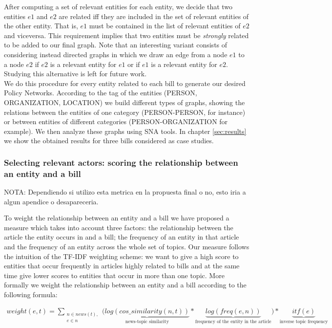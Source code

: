 After computing a set of relevant entities for each entity, we decide that two entities $e1$ and $e2$ are related iff they are included in the set of relevant entities of the other entity. That is, $e1$ must be contained in the list of relevant entities of $e2$ and viceversa. This requirement implies that two entities must be \emph{strongly} related to be added to our final graph. Note that an interesting variant consists of considering instead directed graphs in which we draw an edge from a node $e1$ to a node $e2$ if $e2$ is a relevant entity for $e1$ or if $e1$ is a relevant entity for $e2$. Studying this alternative is left for future work. \\

We do this procedure for every entity related to each bill to generate our desired Policy Networks. According to the tag of the entities (PERSON, ORGANIZATION, LOCATION) we build different types of graphs, showing the relations between the entities of one category (PERSON-PERSON, for instance) or between entities of different categories (PERSON-ORGANIZATION for example). We then analyze these graphs using SNA tools. In chapter \ref{sec:results} we show the obtained results for three bills considered as case studies.


\iffalse
\subsubsection{Selecting relevant actors: scoring the relationship between an entity and a bill}\label{subsec:entity-bill-score}

NOTA: Dependiendo si utilizo esta metrica en la propuesta final o no, esto iria a algun apendice o desapareceria.


To weight the relationship between an entity and a bill we have proposed a measure which takes into account three factors: the relationship between the article the entity occurs in and a bill; the frequency of an entity in that article and the frequency of an entity across the whole set of topics. Our measure follows the intuition of the TF-IDF weighting scheme: we want to give a high score to entities that occur frequently in articles highly related to bills and at the same time give lower scores to entities that occur in more than one topic. More formally we weight the relationship between an entity and a bill according to the following formula:


\begin{eqnarray*}
weight(e,t) = \sum_{\substack{n \in news(t), \\e \in n}}{\Big(\underbrace{log(cos\_similarity(n,t))}_{\text{news-topic similarity}}*\underbrace{log(freq(e,n))}_{\text{frequency of the entity in the article}}} \Big) * \underbrace{itf(e)}_{\text{inverse topic frequency}}\\
\end{eqnarray*}

